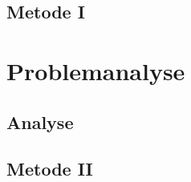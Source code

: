 

\raggedbottom %



\frontmatter	 %


\newpage
\clearpage

\newpage

\tableofcontents*												%

\mainmatter



\chapter{Metode I}


\part{Problemanalyse}
\chapter{Analyse} \label{cha:problemanalyse}






\chapter{Metode II}





